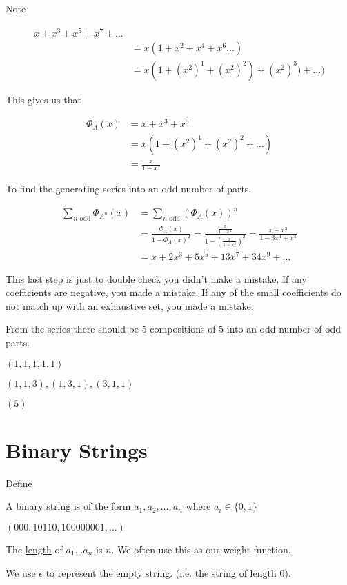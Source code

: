 \documentclass{article}
\begin{document}
Note

\begin{align*}
    x + x^3 + x^5 + x^7 + \ldots \\
    &= x(1 + x^2 + x^4 + x^6 \ldots ) \\
    &= x(1+(x^2)^1 + (x^2)^2) + (x^2)^3) + \ldots )
\end{align*}

This gives us that

\begin{align*}
    \Phi_{A}(x) &= x + x^3 + x^5 \\
    &= x(1+(x^2)^1 + (x^2)^2 + \ldots ) \\
    &= \frac{x}{1-x^2}
\end{align*}

To find the generating series into an odd number of parts.

\begin{align*}
    \sum_{n \text{ odd}}\Phi_{A^n}(x) &= \sum_{n \text{ odd}}(\Phi_{A}(x))^n \\
    &= \frac{\Phi_{A}(x)}{1-\Phi_{A}(x)^2} = \frac{\frac{x}{1-x^2}}{1-(\frac{x}{1-x^2})^2} = \frac{x-x^3}{1-3x^4+x^4} \\
    &= x+2x^3 + 5x^5 + 13x^7 + 34x^9 + \ldots
\end{align*}

This last step is just to double check you didn't make a mistake. If any coefficients are negative, you made a mistake. If any of the small coefficients do not match up with an exhaustive set, you made a mistake. 

From the series there should be $5$ compositions of $5$ into an odd number of odd parts.

$(1,1,1,1,1)$

$(1,1,3), (1,3,1), (3,1,1)$

$(5)$


\section{Binary Strings}

\underline{Define}

A binary string is of the form $a_1, a_2, \ldots, a_n$ where $a_i \in \{0,1\}$

$(000,10110,100000001,\ldots)$

The \underline{length} of $a_1 \ldots a_n$ is $n$. We often use this as our weight function. 

We use $\epsilon$ to represent the empty string. (i.e. the string of length $0$). 
\end{document}
